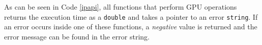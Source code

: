 As can be seen in Code \ref{ipapi}, all functions that perform GPU operations returns the execution time as a {\tt double} and takes a pointer to an error {\tt string}. If an error occurs inside one of these functions, a \emph{negative} value is returned and the error message can be found in the error string. 


